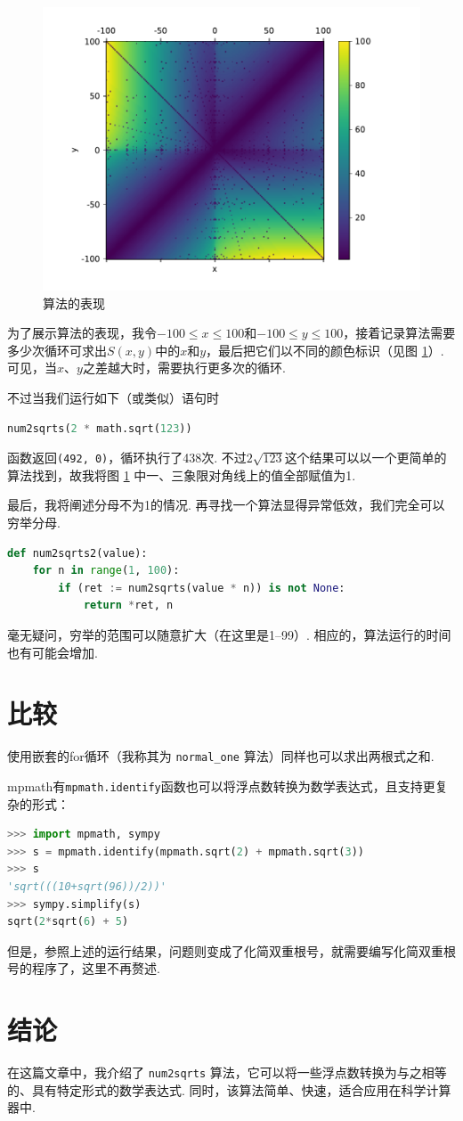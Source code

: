 \documentclass[a4paper, UTF8]{ctexart}
\begin{document}
\begin{figure}[tp]
    \centering
    \includegraphics[width=0.8\linewidth]{perform.pdf}
    \caption{算法的表现}
    \label{fig:perform1}
\end{figure}

为了展示算法的表现，我令$-100\leq x\leq100$和$-100\leq y\leq100$，接着记录算法需要多少次循环可求出$S(x,y)$中的$x$和$y$，最后把它们以不同的颜色标识（见图 \ref{fig:perform1}）. 可见，当$x$、$y$之差越大时，需要执行更多次的循环.

不过当我们运行如下（或类似）语句时
\begin{lstlisting}[language=python]
num2sqrts(2 * math.sqrt(123))
\end{lstlisting}
函数返回\verb|(492, 0)|，循环执行了438次. 不过$2\sqrt{123}$这个结果可以以一个更简单的算法找到，故我将图 \ref{fig:perform1} 中一、三象限对角线上的值全部赋值为1.

最后，我将阐述分母不为1的情况. 再寻找一个算法显得异常低效，我们完全可以穷举分母.
\begin{lstlisting}[language=python, name=example2]
def num2sqrts2(value):
    for n in range(1, 100):
        if (ret := num2sqrts(value * n)) is not None:
            return *ret, n
\end{lstlisting}
毫无疑问，穷举的范围可以随意扩大（在这里是1--99）. 相应的，算法运行的时间也有可能会增加.

\section{比较}
使用嵌套的for循环（我称其为 \verb|normal_one| 算法）同样也可以求出两根式之和.

mpmath\cite{mpmath}有\verb|mpmath.identify|函数也可以将浮点数转换为数学表达式，且支持更复杂的形式：
\begin{lstlisting}[language=python]
>>> import mpmath, sympy
>>> s = mpmath.identify(mpmath.sqrt(2) + mpmath.sqrt(3))
>>> s
'sqrt(((10+sqrt(96))/2))'
>>> sympy.simplify(s)
sqrt(2*sqrt(6) + 5)
\end{lstlisting}
但是，参照上述的运行结果，问题则变成了化简双重根号，就需要编写化简双重根号的程序了，这里不再赘述.

\section{结论}
在这篇文章中，我介绍了 \verb|num2sqrts| 算法，它可以将一些浮点数转换为与之相等的、具有特定形式的数学表达式. 同时，该算法简单、快速，适合应用在科学计算器中.

\printbibliography[title={参考文献}]
\end{document}
